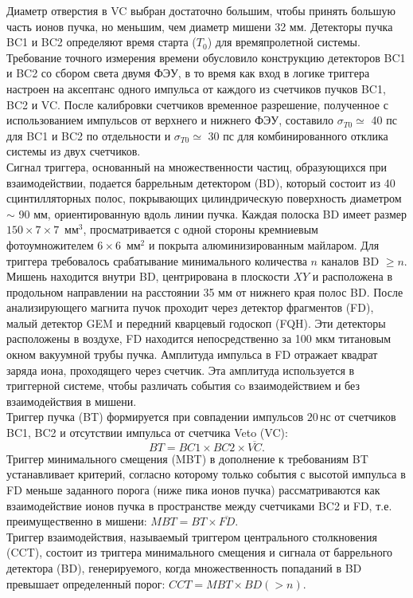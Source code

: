 Диаметр отверстия в VC выбран достаточно большим, чтобы принять большую часть ионов пучка, но меньшим, чем диаметр мишени 32 мм.
Детекторы пучка BC1 и BC2 определяют время старта ($T_0$) для времяпролетной системы. Требование точного измерения времени обусловило
конструкцию детекторов BC1 и BC2 со сбором света двумя ФЭУ, в то время как вход в логике триггера настроен на аксептанс одного импульса от
каждого из счетчиков пучков BC1, BC2 и VC.
После калибровки счетчиков временное разрешение, полученное  с использованием импульсов от верхнего и нижнего ФЭУ, составило $\sigma_{T0} \simeq$ 40 пс
для BC1 и BC2 по отдельности и $\sigma_{T0} \simeq$  30 пс для комбинированного отклика системы из двух счетчиков.\\
Сигнал триггера, основанный на множественности частиц, образующихся при взаимодействии, подается баррельным детектором (BD), который состоит
из 40 сцинтилляторных полос, покрывающих цилиндрическую поверхность диаметром $\sim$ 90 мм, ориентированную вдоль линии пучка.
Каждая полоска BD имеет размер $150\times7\times7\,$ мм$^{3}$,  просматривается с одной стороны кремниевым фотоумножителем  $6\times 6\,$ мм$^{2}$  и покрыта алюминизированным майларом. Для триггера
требовалось срабатывание минимального количества $n$ каналов BD $\ge n$.
Мишень находится внутри BD, центрирована в плоскости $XY$ и расположена в продольном направлении на расстоянии 35 мм от нижнего края полос BD. 
После анализирующего магнита пучок проходит через детектор
фрагментов (FD), малый детектор GEM и передний кварцевый годоскоп (FQH).
Эти детекторы расположены в воздухе, FD находится непосредственно за 100 мкм титановым окном вакуумной трубы пучка.
Амплитуда импульса в FD отражает квадрат заряда иона, проходящего через счетчик. Эта амплитуда используется в триггерной системе, чтобы
различать события сo взаимодействием и без взаимодействия в мишени.\\
Триггер пучка (BT) формируется при совпадении импульсов $20\,$нс от счетчиков BC1, BC2 и отсутствии импульса от счетчика Veto (VC):
$$ BT=BC1 \times BC2 \times \overline{VC}. $$
Триггер минимального смещения (MBT) в дополнение к требованиям BT устанавливает критерий, согласно которому только 
события с высотой импульса в FD меньше заданного порога (ниже пика ионов пучка) рассматриваются как взаимодействие ионов пучка в пространстве между
счетчиками BC2 и FD, т.е. преимущественно в мишени: $MBT=BT \times \overline{FD}$.\\
Триггер взаимодействия, называемый триггером центрального столкновения (CCT), состоит из триггера минимального смещения и сигнала от баррельного
детектора (BD), генерируемого, когда множественность попаданий в BD превышает определенный порог: $CCT = MBT \times BD(> n)$.

